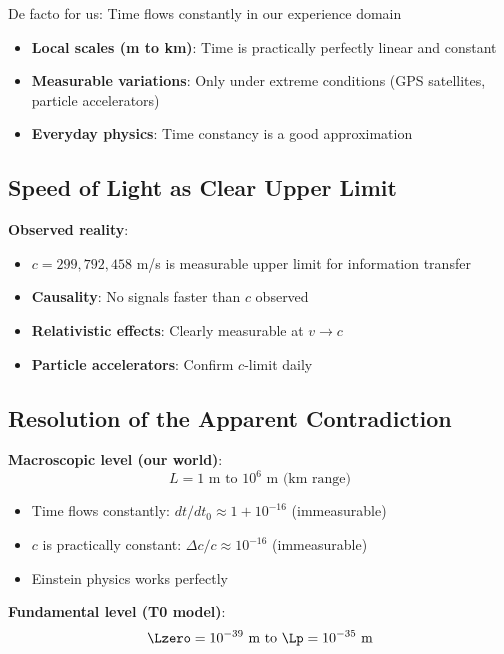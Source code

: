 	De facto for us: Time flows constantly in our experience domain
	\begin{itemize}
		\item \textbf{Local scales (m to km)}: Time is practically perfectly linear and constant
		\item \textbf{Measurable variations}: Only under extreme conditions (GPS satellites, particle accelerators)
		\item \textbf{Everyday physics}: Time constancy is a good approximation
	\end{itemize}
	
	\subsection{Speed of Light as Clear Upper Limit}
	
	\textbf{Observed reality}:
	\begin{itemize}
		\item $c = 299,792,458$ m/s is measurable upper limit for information transfer
		\item \textbf{Causality}: No signals faster than $c$ observed
		\item \textbf{Relativistic effects}: Clearly measurable at $v \rightarrow c$
		\item \textbf{Particle accelerators}: Confirm $c$-limit daily
	\end{itemize}
	
	\subsection{Resolution of the Apparent Contradiction}
	
	\textbf{Macroscopic level (our world)}:
	\begin{equation}
		L = 1 \text{ m to } 10^6 \text{ m (km range)}
	\end{equation}
	
	\begin{itemize}
		\item Time flows constantly: $dt/dt_0 \approx 1 + 10^{-16}$ (immeasurable)
		\item $c$ is practically constant: $\Delta c/c \approx 10^{-16}$ (immeasurable)
		\item Einstein physics works perfectly
	\end{itemize}
	
	\textbf{Fundamental level (T0 model)}:
	\begin{equation}
		\Lzero = 10^{-39} \text{ m to } \Lp = 10^{-35} \text{ m}
	\end{equation}
	
